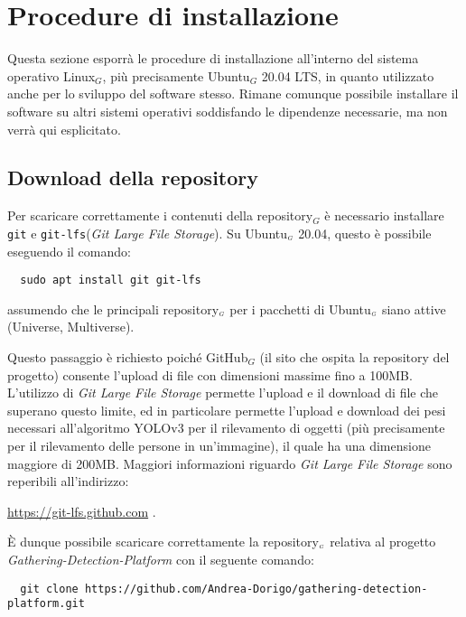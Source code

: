 \chapter{Procedure di installazione}\label{ProceduraDiInstallazione}
Questa sezione esporrà le procedure di installazione all'interno del sistema operativo Linux$_G$, più precisamente Ubuntu$_G$ 20.04 LTS, in quanto utilizzato anche per lo sviluppo del software stesso.
Rimane comunque possibile installare il software su altri sistemi operativi soddisfando le dipendenze necessarie, ma non verrà qui esplicitato.

\section{Download della repository}\label{ProceduraDiInstallazioneDownloadRepo}
Per scaricare correttamente i contenuti della repository$_G$ è necessario installare \texttt{git} e \texttt{git-lfs}(\textit{Git Large File Storage}).
Su Ubuntu$_{\scaleto{G}{3pt}}$ 20.04, questo è possibile eseguendo il comando:
\begin{lstlisting}
  sudo apt install git git-lfs
\end{lstlisting}
assumendo che le principali repository$_{\scaleto{G}{3pt}}$ per i pacchetti di Ubuntu$_{\scaleto{G}{3pt}}$ siano attive (Universe, Multiverse).

Questo passaggio è richiesto poiché GitHub$_G$ (il sito che ospita la repository del progetto) consente l'upload di file con dimensioni massime fino a 100MB.
L'utilizzo di \textit{Git Large File Storage} permette l'upload e il download di file che superano questo limite, ed in particolare permette l'upload e download dei pesi necessari all'algoritmo YOLOv3 per il rilevamento di oggetti (più precisamente per il rilevamento delle persone in un'immagine), il quale ha una dimensione maggiore di 200MB. Maggiori informazioni riguardo \textit{Git Large File Storage} sono reperibili all'indirizzo:
\begin{center}
  \item \url{https://git-lfs.github.com} .
\end{center}

È dunque possibile scaricare correttamente la repository$_{\scaleto{G}{3pt}}$ relativa al progetto \textit{Gathering-Detection-Platform} con il seguente comando:
\begin{lstlisting}
  git clone https://github.com/Andrea-Dorigo/gathering-detection-platform.git
\end{lstlisting}

